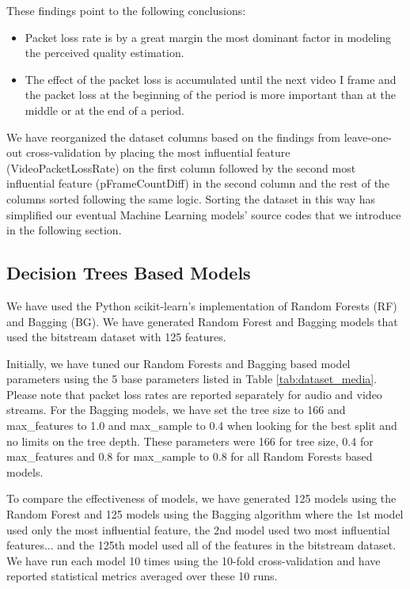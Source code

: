 \documentclass[journal]{IEEEtran}
\begin{document}
These findings point to the following conclusions:

\begin{itemize}
  \item Packet loss rate is by a great margin the most dominant factor in modeling the perceived quality estimation.
  \item The effect of the packet loss is accumulated until the next video I frame and the packet loss at the beginning of the period is more important than at the middle or at the end of a period.
\end{itemize}

We have reorganized the dataset columns based on the findings from leave-one-out cross-validation by placing the most influential feature (VideoPacketLossRate) on the first column followed by the second most influential feature (pFrameCountDiff) in the second column and the rest of the columns sorted following the same logic. Sorting the dataset in this way has simplified our eventual Machine Learning models' source codes that we introduce in the following section. 

\vspace{-0.2cm}
\subsection{Decision Trees Based Models} 

We have used the Python scikit-learn's implementation of Random Forests (RF) and Bagging (BG). We have generated Random Forest and Bagging models that used the bitstream dataset with 125 features. 

Initially, we have tuned our Random Forests and Bagging based model parameters using the 5 base parameters listed in Table \ref{tab:dataset_media}. Please note that packet loss rates are reported separately for audio and video streams. For the Bagging models, we have set the tree size to 166 and max\_features to 1.0 and max\_sample to 0.4 when looking for the best split and no limits on the tree depth. These parameters were 166 for tree size, 0.4 for max\_features and 0.8 for max\_sample to 0.8 for all Random Forests based models. 

To compare the effectiveness of models, we have generated 125 models using the Random Forest and 125 models using the Bagging algorithm where the 1st model used only the most influential feature, the 2nd model used two most influential features... and the 125th model used all of the features in the bitstream dataset. We have run each model 10 times using the 10-fold cross-validation and have reported statistical metrics averaged over these 10 runs. 
\end{document}
